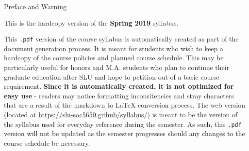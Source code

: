 \begin{center}
{\huge Preface and Warning} \\
\end{center}
\vspace{5mm}
This is the hardcopy version of the \textbf{Spring 2019} syllabus.
\vspace{5mm}
\par \noindent This \texttt{.pdf} version of the course syllabus is automatically created as part of the document generation process. It is meant for students who wish to keep a hardcopy of the course policies and planned course schedule. This may be particularly useful for honors and M.A. students who plan to continue their graduate education after SLU and hope to petition out of a basic course requirement. \textbf{Since it is automatically created, it is not optimized for easy use} - readers may notice formatting inconsitencies and stray characters that are a result of the markdown to \LaTeX{} conversion process. The web version (located at \href{https://slu-soc5650.github/syllabus/}{https://slu-soc5650.github/syllabus/}) is meant to be the version of the syllabus used for everyday reference during the semester. As such, this \texttt{.pdf} version will not be updated as the semester progresses should any changes to the course schedule be necessary.

